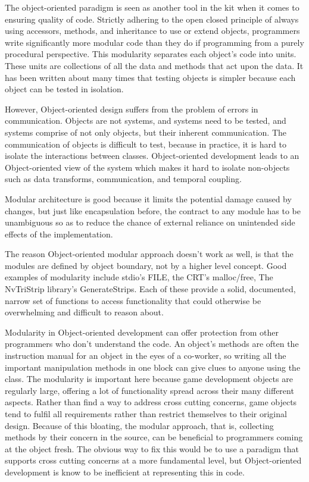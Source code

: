 The object-oriented paradigm is seen as another tool in the kit when it comes
to ensuring quality of code. Strictly adhering to the open closed principle of
always using accessors, methods, and inheritance to use or extend objects,
programmers write significantly more modular code than they do if programming
from a purely procedural perspective. This modularity separates each object's
code into units. These units are collections of all the data and methods that
act upon the data. It has been written about many times that testing objects is
simpler because each object can be tested in isolation.

However, Object-oriented design suffers from the problem of errors in
communication. Objects are not systems, and systems need to be tested, and
systems comprise of not only objects, but their inherent communication. The
communication of objects is difficult to test, because in practice, it is hard
to isolate the interactions between classes. Object-oriented development leads
to an Object-oriented view of the system which makes it hard to isolate
non-objects such as data transforms, communication, and temporal coupling.

Modular architecture is good because it limits the potential damage caused by
changes, but just like encapsulation before, the contract to any module has to
be unambiguous so as to reduce the chance of external reliance on unintended
side effects of the implementation.

The reason Object-oriented modular approach doesn't work as well, is that the
modules are defined by object boundary, not by a higher level concept. Good
examples of modularity include stdio's FILE, the CRT's malloc/free, The
NvTriStrip library's GenerateStrips. Each of these provide a solid, documented,
narrow set of functions to access functionality that could otherwise be
overwhelming and difficult to reason about.

Modularity in Object-oriented development can offer protection from other
programmers who don't understand the code. An object's methods are often the
instruction manual for an object in the eyes of a co-worker, so writing all the
important manipulation methods in one block can give clues to anyone using the
class. The modularity is important here because game development objects are
regularly large, offering a lot of functionality spread across their many
different aspects. Rather than find a way to address cross cutting concerns,
game objects tend to fulfil all requirements rather than restrict themselves to
their original design. Because of this bloating, the modular approach, that is,
collecting methods by their concern in the source, can be beneficial to
programmers coming at the object fresh. The obvious way to fix this would be to
use a paradigm that supports cross cutting concerns at a more fundamental
level, but Object-oriented development is know to be inefficient at
representing this in code.

